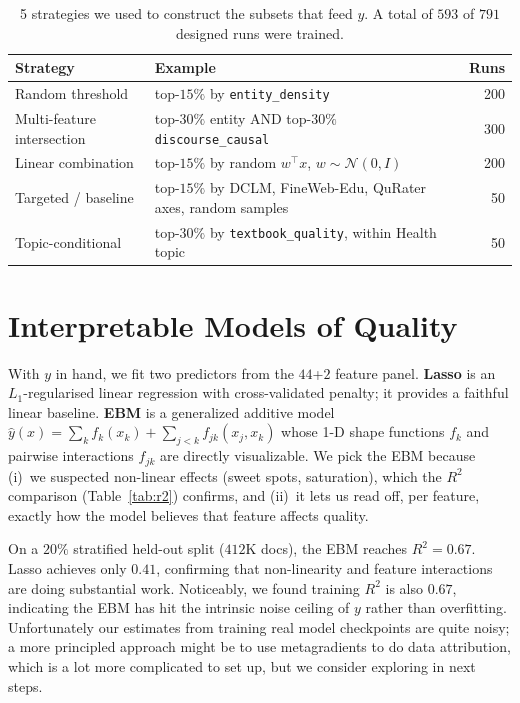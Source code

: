 \documentclass[twocolumn,letterpaper,10pt]{article}
\begin{document}
\begin{table}[t]
\small
\centering
\begin{tabular}{p{1.6cm} p{4.2cm} r}
\toprule
Strategy & Example & Runs \\
\midrule
Random threshold & top-$15\%$ by \texttt{entity\_density} & 200 \\
Multi-feature intersection & top-$30\%$ entity AND top-$30\%$ \texttt{discourse\_causal} & 300 \\
Linear combination & top-$15\%$ by random $w^{\!\top} x$, $w\sim\mathcal{N}(0,I)$ & 200 \\
Targeted / baseline & top-$15\%$ by DCLM, FineWeb-Edu, QuRater axes, random samples & 50 \\
Topic-conditional & top-$30\%$ by \texttt{textbook\_quality}, within Health topic & 50 \\
\bottomrule
\end{tabular}
\caption{5 strategies we used to construct the subsets that
feed $y$. A total of $593$ of $791$ designed
runs were trained.}
\label{tab:strategies}
\end{table}

\section{Interpretable Models of Quality}
\label{sec:models}

With $y$ in hand, we fit two predictors from the $44$+$2$ feature
panel. \textbf{Lasso} is an $L_1$-regularised linear regression with
cross-validated penalty; it provides a faithful linear baseline.
\textbf{EBM} is a generalized additive model
$\hat{y}(x)=\sum_k f_k(x_k)+\sum_{j<k} f_{jk}(x_j,x_k)$ whose 1-D
shape functions $f_k$ and pairwise interactions $f_{jk}$ are directly
visualizable. We pick the EBM because (i)~we suspected non-linear
effects (sweet spots, saturation), which the $R^2$ comparison
(Table~\ref{tab:r2}) confirms, and (ii)~it lets us read off, per
feature, exactly how the model believes that feature affects quality.


On a $20\%$ stratified held-out split ($412$K docs), the EBM reaches
$R^2 = 0.67$. Lasso achieves only $0.41$, confirming that
non-linearity and feature interactions are doing substantial work.
Noticeably, we found training $R^2$ is also $0.67$, indicating the EBM has hit the
intrinsic noise ceiling of $y$ rather than overfitting. Unfortunately our estimates from training real model checkpoints are quite noisy; a more principled approach might be to use metagradients to do data attribution, which is a lot more complicated to set up, but we consider exploring in next steps.
\end{document}

